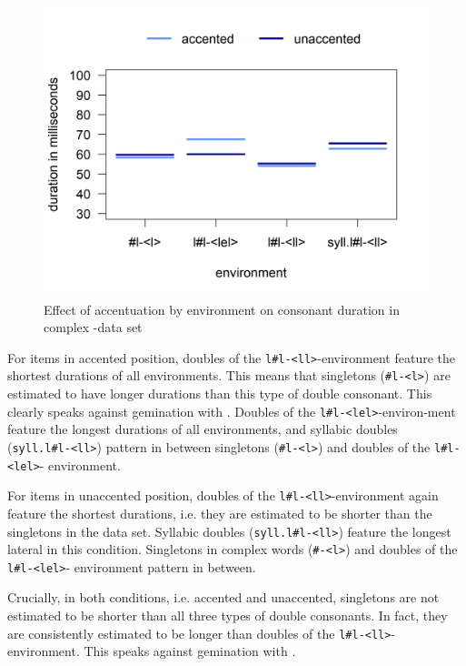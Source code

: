 \begin{figure} [h!]
	\centering
	\includegraphics [scale=0.5] {images/Experiment/LyModelInterEnvAcc}
	\caption{Effect of accentuation by environment on consonant duration in complex -data set}
	\label{fig:Env Acc lyComplex experiment}
\end{figure}

For items in accented position, doubles of the \texttt{l\#l-<ll>}-environment feature the shortest durations of all environments. This means that singletons (\texttt{\#l-<l>}) are estimated to have longer durations than this type of double consonant. This clearly speaks against gemination with . Doubles of the \texttt{l\#l-<lel>}-environ-ment feature the longest durations of all environments, and syllabic doubles (\texttt{syll.l\#l-<ll>}) pattern in between singletons  (\texttt{\#l-<l>}) and doubles of the \texttt{l\#l- <lel>}- environment.


For items in unaccented position, doubles of the \texttt{l\#l-<ll>}-environment again feature the shortest durations, i.e. they are estimated to be shorter than the singletons in the data set. Syllabic doubles (\texttt{syll.l\#l-<ll>}) feature the longest lateral in this condition.  Singletons in complex words (\texttt{\#-<l>}) and doubles of the \texttt{l\#l-<lel>}- environment  pattern in between.

Crucially, in both conditions, i.e. accented and unaccented, singletons are not estimated to be shorter than all three types of double consonants. In fact, they are consistently estimated to be longer than doubles of the  \texttt{l\#l-<ll>}-environment. This speaks against gemination with .

